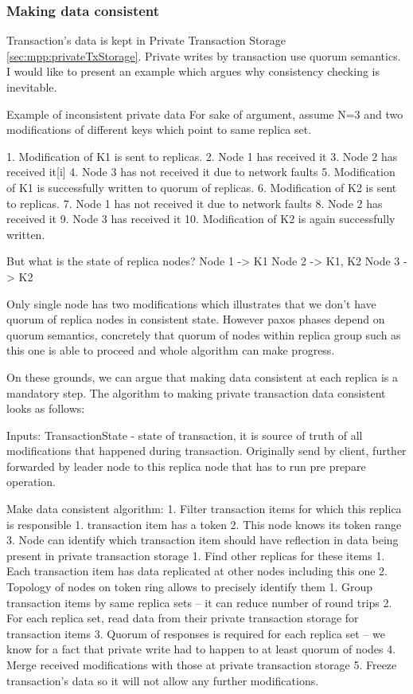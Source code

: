 \subsubsection{Making data consistent}
Transaction’s data is kept in Private Transaction Storage \ref{sec:mpp:privateTxStorage}. Private writes by transaction use quorum semantics. I would like to present an example which argues why consistency checking is inevitable.


Example of inconsistent private data
For sake of argument, assume N=3 and two modifications of different keys which point to same replica set.


1. Modification of K1 is sent to replicas.
2. Node 1 has received it
3. Node 2 has received it[i]
4. Node 3 has not received it due to network faults
5. Modification of K1 is successfully written to quorum of replicas.
6. Modification of K2 is sent to replicas.
7. Node 1 has not received it due to network faults
8. Node 2 has received it
9. Node 3 has received it
10. Modification of K2 is again successfully written.


But what is the state of replica nodes?
Node 1 -> { K1 }
Node 2 -> { K1, K2 }
Node 3 -> { K2 }


Only single node has two modifications which illustrates that we don’t have quorum of replica nodes in consistent state. However paxos phases depend on quorum semantics, concretely that quorum of nodes within replica group such as this one is able to proceed and whole algorithm can make progress. 


On these grounds, we can argue that making data consistent at each replica is a mandatory step.
The algorithm to making private transaction data consistent looks as follows:


Inputs:
        TransactionState - state of transaction, it is source of truth of all modifications that happened during transaction. Originally send by client, further forwarded by leader node to this replica node that has to run pre prepare operation.


        Make data consistent algorithm:        
1. Filter transaction items for which this replica is responsible
   1. transaction item has a token
   2. This node knows its token range
   3. Node can identify which transaction item should have reflection in data being present in private transaction storage
1. Find other replicas for these items
   1. Each transaction item has data replicated at other nodes including this one
   2. Topology of nodes on token ring allows to precisely identify them
1. Group transaction items by same replica sets -- it can reduce number of round trips
2. For each replica set, read data from their private transaction storage for transaction items
3. Quorum of responses is required for each replica set -- we know for a fact that private write had to happen to at least quorum of nodes
4. Merge received modifications with those at private transaction storage
5. Freeze transaction’s data so it will not allow any further modifications.



